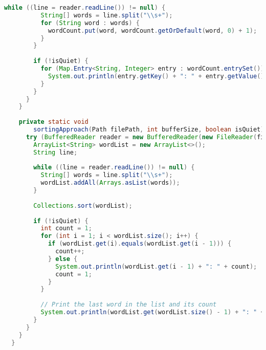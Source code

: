 \documentclass{article}
\begin{document}
\begin{lstlisting}[language=Java, 
  basicstyle=\ttfamily\scriptsize, 
  numbers=none, 
  frame=single,
  showspaces=false,
  caption={Source Code for the WordFrequencyCounter.java file.}]
        while ((line = reader.readLine()) != null) {
          String[] words = line.split("\\s+");
          for (String word : words) {
            wordCount.put(word, wordCount.getOrDefault(word, 0) + 1);
          }
        }
  
        if (!isQuiet) {
          for (Map.Entry<String, Integer> entry : wordCount.entrySet()) {
            System.out.println(entry.getKey() + ": " + entry.getValue());
          }
        }
      }
    }
  
    private static void
        sortingApproach(Path filePath, int bufferSize, boolean isQuiet) throws IOException {
      try (BufferedReader reader = new BufferedReader(new FileReader(filePath.toFile()), bufferSize)) {
        ArrayList<String> wordList = new ArrayList<>();
        String line;
  
        while ((line = reader.readLine()) != null) {
          String[] words = line.split("\\s+");
          wordList.addAll(Arrays.asList(words));
        }
  
        Collections.sort(wordList);
  
        if (!isQuiet) {
          int count = 1;
          for (int i = 1; i < wordList.size(); i++) {
            if (wordList.get(i).equals(wordList.get(i - 1))) {
              count++;
            } else {
              System.out.println(wordList.get(i - 1) + ": " + count);
              count = 1;
            }
          }
  
          // Print the last word in the list and its count
          System.out.println(wordList.get(wordList.size() - 1) + ": " + count);
        }
      }
    }
  }  
\end{lstlisting}

\clearpage
\end{document}
